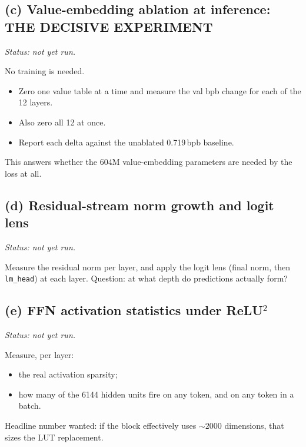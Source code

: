 \documentclass[11pt]{article}
\begin{document}
\subsection*{(c) Value-embedding ablation at inference: THE DECISIVE EXPERIMENT}
\textit{Status: not yet run.}

No training is needed.
\begin{itemize}
\item Zero one value table at a time and measure the val bpb change for each of the 12 layers.
\item Also zero all 12 at once.
\item Report each delta against the unablated 0.719\,bpb baseline.
\end{itemize}
This answers whether the 604M value-embedding parameters are needed by the loss at all.

\subsection*{(d) Residual-stream norm growth and logit lens}
\textit{Status: not yet run.}

Measure the residual norm per layer, and apply the logit lens (final norm, then \texttt{lm\_head}) at each layer. Question: at what depth do predictions actually form?

\subsection*{(e) FFN activation statistics under ReLU$^2$}
\textit{Status: not yet run.}

Measure, per layer:
\begin{itemize}
\item the real activation sparsity;
\item how many of the 6144 hidden units fire on any token, and on any token in a batch.
\end{itemize}
Headline number wanted: if the block effectively uses ${\sim}2000$ dimensions, that sizes the LUT replacement.
\end{document}
